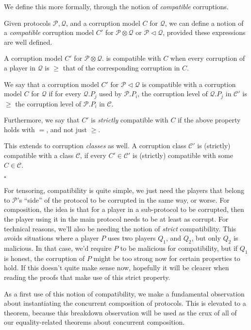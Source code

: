 We define this more formally, through the notion of \emph{compatible}
corruptions.

\begin{definition}
  \label{def:compatc}
  Given protocols $\mathscr{P}, \mathscr{Q}$, and a corruption model
  $C$ for $\mathscr{Q}$, we can define a notion of a \emph{compatible}
  corruption model $C'$ for $\mathscr{P} \otimes \mathscr{Q}$ or $\mathscr{P} \lhd \mathscr{Q}$,
  provided these expressions are well defined.

  A corruption model $C'$ for $\mathscr{P} \otimes \mathscr{Q}$.
  is compatible with $C$ when every corruption of a player
  in $\mathscr{Q}$ is $\geq$ that of the corresponding corruption in $C$.

  We say that a corruption model $C'$ for $\mathscr{P} \lhd \mathscr{Q}$ is compatible with
a corruption model $C$ for $\mathscr{Q}$ if for every
$\mathscr{Q}.P_j$ used by $\mathscr{P}.P_i$, the corruption
level of $\mathscr{Q}.P_j$ in $\mathscr{C}'$ is $\geq$ the corruption level of $\mathscr{P}.P_i$
in $\mathscr{C}$.

  Furthermore, we say that $C'$ is \emph{strictly} compatible
  with $C$ if the above property holds with $=$, and not just $\geq$.

  This extends to corruption \emph{classes} as well.
  A corruption class $\mathscr{C}'$ is (strictly) compatible with a class $\mathscr{C}$,
  if every $C' \in \mathscr{C}'$ is (strictly) compatible with some $C \in \mathscr{C}$.

  $\square$
\end{definition}

For tensoring, compatibility is quite simple, we just need the players
that belong to $\mathscr{P}$'s ``side'' of the protocol
to be corrupted in the same way, or worse.
For composition, the idea is that for a player in a sub-protocol
to be corrupted, then the player using it in the main protocol
needs to be at least as corrupt.
For technical reasons, we'll also be needing
the notion of \emph{strict} compatibility.
This avoids situations where a player $P$ uses two players $Q_1$,
and $Q_2$, but only $Q_2$ is malicious.
In that case, we'd require $P$ to be malicious for compatibility,
but if $Q_1$ is honest, the corruption of $P$
might be too strong now for certain properties to hold.
If this doesn't quite make sense now, hopefully it will
be clearer when reading the proofs that make use of this strict
property.

As a first use of this notion of compatibility, we make
a fundamental observation about instantiating the concurrent composition
of protocols.
This is elevated to a theorem, because this breakdown observation
will be used as the crux of all of our equality-related theorems about concurrent
composition.


